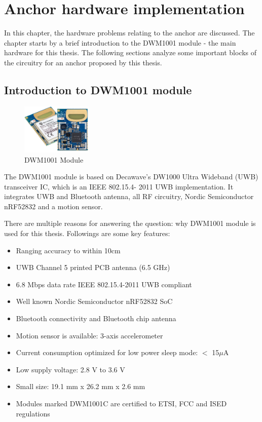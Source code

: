 \documentclass[\main/main.tex]{subfiles}
\begin{document}
\graphicspath{{img/}{04_hardware/img/}}
\setlength{\abovecaptionskip}{0pt}
\setlength{\belowcaptionskip}{0pt}

\chapter{Anchor hardware implementation}
In this chapter, the hardware problems relating to the anchor are discussed. The chapter starts by a brief introduction to the DWM1001 module - the main hardware for this thesis. The following sections analyze some important blocks of the circuitry for an anchor proposed by this thesis. 

\section{Introduction to DWM1001 module}
\begin{figure}[H]
    \begin{center}
        \includegraphics[width=0.3\textwidth]{DWM1001-Module_ProdPage_600x430.jpg}
    \end{center}
    \caption{DWM1001 Module}
    \label{fig:dwm1001c_module}
\end{figure}

The DWM1001 module is based on Decawave's DW1000 Ultra
Wideband (UWB) transceiver IC, which is an IEEE 802.15.4-
2011 UWB implementation. It integrates UWB and Bluetooth
antenna, all RF circuitry, Nordic Semiconductor nRF52832 and
a motion sensor.

There are multiple reasons for answering the question: why DWM1001 module is used for this thesis.
Followings are some key features:
\begin{itemize}
    \item Ranging accuracy to within 10cm
    \item UWB Channel 5 printed PCB antenna (6.5 GHz)
    \item 6.8 Mbps data rate IEEE 802.15.4-2011 UWB compliant
    \item Well known Nordic Semiconductor nRF52832 SoC
    \item Bluetooth connectivity and Bluetooth chip antenna
    \item Motion sensor is available: 3-axis accelerometer
    \item Current consumption optimized for low power sleep mode: $<$ 15$\mu$A
    \item Low supply voltage: 2.8 V to 3.6 V
    \item Small size: 19.1 mm x 26.2 mm x 2.6 mm
    \item Modules marked DWM1001C are certified to ETSI, FCC and ISED regulations
\end{itemize}
\end{document}
